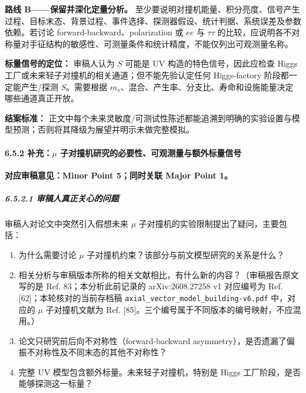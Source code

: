 \documentclass[
  chinese,
  UTF8]{ctexart}
\providecommand{\tightlist}{%
  \setlength{\itemsep}{0pt}\setlength{\parskip}{0pt}}
\begin{document}
\textbf{路线 B------保留并深化定量分析。}
至少要说明对撞机能量、积分亮度、信号产生过程、目标末态、背景过程、事件选择、探测器假设、统计判据、系统误差及参数依赖。若讨论
forward-backward、polarization 或 \(ee\) 与 \(\tau\tau\)
的比较，应说明各不对称量对手征结构的敏感性、可测量条件和统计精度，不能仅列出可观测量名称。

\textbf{标量信号的定位：} 审稿人认为 \(S\) 可能是 UV
构造的特色信号，因此应检查 Higgs
工厂或未来轻子对撞机的相关通道；但不能先验认定任何 Higgs-factory
阶段都一定能产生/探测 \(S\)。需要根据
\(m_s\)、混合、产生率、分支比、寿命和设施能量决定哪些通道真正开放。

\textbf{结案标准：}
正文中每个未来灵敏度/可测试性陈述都能追溯到明确的实验设置与模型预测；否则将其降级为展望并明示未做完整模拟。

\paragraph{\texorpdfstring{6.5.2 补充：\ensuremath{\mu}
子对撞机研究的必要性、可观测量与额外标量信号}{6.5.2 补充： 子对撞机研究的必要性、可观测量与额外标量信号}}\label{ux8865ux5145-ux5b50ux5bf9ux649eux673aux7814ux7a76ux7684ux5fc5ux8981ux6027ux53efux89c2ux6d4bux91cfux4e0eux989dux5916ux6807ux91cfux4fe1ux53f7}

\textbf{对应审稿意见：Minor Point 5；同时关联 Major Point 1。}

\subparagraph{6.5.2.1
审稿人真正关心的问题}\label{ux5ba1ux7a3fux4ebaux771fux6b63ux5173ux5fc3ux7684ux95eeux9898-3}

审稿人对论文中突然引入假想未来 \ensuremath{\mu}
子对撞机的实验限制提出了疑问，主要包括：

\begin{enumerate}
\def\labelenumi{\arabic{enumi}.}
\tightlist
\item
  为什么需要讨论 \ensuremath{\mu}
  子对撞机约束？该部分与前文模型研究的关系是什么？
\item
  相关分析与审稿版本所称的相关文献相比，有什么新的内容？（审稿报告原文写的是
  Ref. 83；本分析此前记录的 arXiv:2608.27258 v1 对应编号为 Ref.
  {[}62{]}；本轮核对的当前存档稿
  \texttt{axial\_vector\_model\_building-v6.pdf} 中，对应的
  \ensuremath{\mu} 子对撞机文献为 Ref.
  {[}85{]}。三个编号属于不同版本的编号映射，不应混用。）
\item
  论文只研究前后向不对称性（forward-backward
  asymmetry），是否遗漏了偏振不对称性及不同末态的其他不对称性？
\item
  完整 UV 模型包含额外标量。未来轻子对撞机，特别是 Higgs
  工厂阶段，是否能够探测这一标量？
\end{enumerate}
\end{document}
